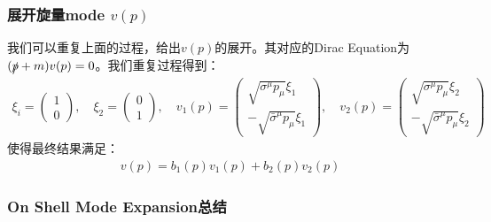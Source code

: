 \subsubsection{展开旋量mode $ v(p) $}

我们可以重复上面的过程，给出$ v(p) $的展开。其对应的Dirac Equation为$ (\slashed{p}+m)v(p)=0 $。我们重复过程得到：
\begin{align}
  \xi_i =
  \begin{pmatrix}1\\0
  \end{pmatrix},\quad \xi_2=
  \begin{pmatrix}0\\1
  \end{pmatrix} , \quad v_1(p)=
  \begin{pmatrix}\sqrt{\sigma^\mu
    p_\mu}\xi_1\\-\sqrt{\bar{\sigma}^\mu p_\mu}\xi_1
  \end{pmatrix},\quad v_2(p)=
  \begin{pmatrix}\sqrt{\sigma^\mu
    p_\mu}\xi_2\\-\sqrt{\bar{\sigma}^\mu p_\mu}\xi_2
  \end{pmatrix}
\end{align}
使得最终结果满足：
\begin{align}
  v(p) = b_1(p)v_1(p) + b_2(p)v_2(p)
\end{align}

\subsubsection{On Shell Mode Expansion总结}

